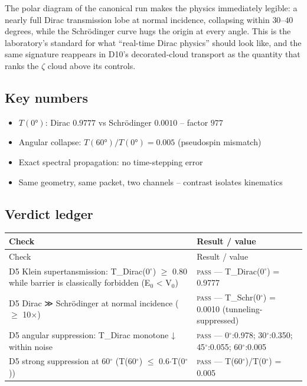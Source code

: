 \documentclass[11pt,a4paper]{article}
\begin{document}
The polar diagram of the canonical run makes the physics immediately legible: a nearly full Dirac transmission lobe at normal incidence, collapsing within $30$--$40$ degrees, while the Schrödinger curve hugs the origin at every angle. This is the laboratory's standard for what ``real-time Dirac physics'' should look like, and the same signature reappears in D10's decorated-cloud transport as the quantity that ranks the $\zeta$ cloud above its controls.

\subsection{Key numbers}
\begin{tcolorbox}[colback=labblue!6, colframe=labblue!70!black, boxrule=0.6pt, title={Key results (canonical run)}]
\begin{itemize}[leftmargin=1.2em, itemsep=0.15em]
\item $T(0°)$: Dirac $0.9777$ vs Schrödinger $0.0010$ -- factor $977$
\item Angular collapse: $T(60°)/T(0°) = 0.005$ (pseudospin mismatch)
\item Exact spectral propagation: no time-stepping error
\item Same geometry, same packet, two channels -- contrast isolates kinematics
\end{itemize}
\end{tcolorbox}

\subsection{Verdict ledger}
\begin{longtable}{@{}p{}p{}@{}}
\toprule
Check & Result / value \\
\midrule
\endfirsthead
\toprule
Check & Result / value \\
\midrule
\endhead
\bottomrule
\endfoot
D5 Klein supertansmission: T\_Dirac(0$^\circ$) $\ge$ 0.80 while barrier is classically forbidden (E$_{0}$ < V$_{0}$) & \textsc{pass} --- T\_Dirac(0$^\circ$) = 0.9777 \\
D5 Dirac ≫ Schrödinger at normal incidence ($\ge$ 10$\times$) & \textsc{pass} --- T\_Schr(0$^\circ$) = 0.0010 (tunneling-suppressed) \\
D5 angular suppression: T\_Dirac monotone ↓ within noise & \textsc{pass} --- 0$^\circ$:0.978; 30$^\circ$:0.350; 45$^\circ$:0.055; 60$^\circ$:0.005 \\
D5 strong suppression at 60$^\circ$ (T(60$^\circ$) $\le$ 0.6$\cdot$T(0$^\circ$)) & \textsc{pass} --- T(60$^\circ$)/T(0$^\circ$) = 0.005 \\
\end{longtable}
\end{document}
